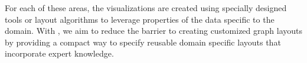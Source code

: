For each of these areas, the visualizations are created using specially
designed tools or layout algorithms to leverage properties of the data
specific to the domain. With \projectname, we aim to reduce the barrier to
creating customized graph layouts by providing a compact way to specify
reusable domain specific layouts that incorporate expert knowledge.





